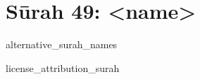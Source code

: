 \begin{comment}
The following strings are to be replaced by a script, in order to use this file as a template (all upper case):-
* sNO = sūrah number, without leading zeros
* sZO = sūrah number, with leading zeros
\end{comment}
\begin{comment}
The following tags are declared here:-
alternative_surah_names
license_attribution_surah
\end{comment}
\section{Sūrah 49: <name>}
\begin{taggedblock}{alternative_surah_names}
\end{taggedblock}
\END

\begin{taggedblock}{license_attribution_surah}

\end{taggedblock}